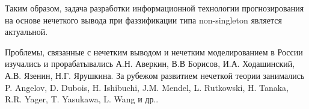 
Таким образом, задача разработки информационной технологии прогнозирования на основе нечеткого вывода при фаззификации типа non-singleton является актуальной.


Проблемы, связанные с нечетким выводом и нечетким моделированием в России изучались и прорабатывались А.Н. Аверкин, В.В Борисов, И.А. Ходашинский, А.В. Язенин, Н.Г. Ярушкина. За рубежом развитием нечеткой теории занимались  P. Angelov, D. Dubois, H. Ishibuchi, J.M. Mendel, L. Rutkowski, H. Tanaka, R.R. Yager, T. Yasukawa, L. Wang и др..



\ifsynopsis
\else
\fi


